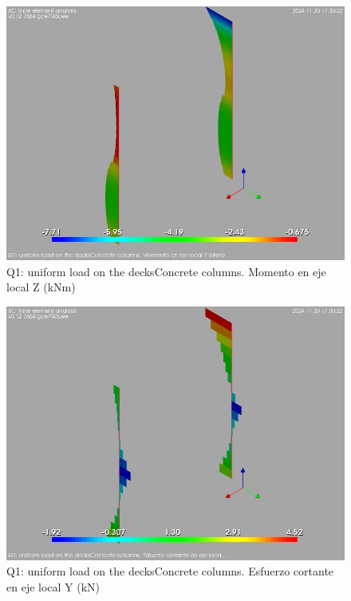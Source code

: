 \begin{figure}[ht]
\begin{center}
\includegraphics[width=\linewidth]{results/graphics/resSimplLC/QdeckscolumnZconcrMz.png}
\caption{Q1: uniform load on the decksConcrete columns. Momento en eje local Z (kNm)}
\label{QdeckscolumnZconcrMz}
\end{center}
\end{figure}
\begin{figure}[ht]
\begin{center}
\includegraphics[width=\linewidth]{results/graphics/resSimplLC/QdeckscolumnZconcrVy.png}
\caption{Q1: uniform load on the decksConcrete columns. Esfuerzo cortante en eje local Y (kN)}
\label{QdeckscolumnZconcrVy}
\end{center}
\end{figure}
